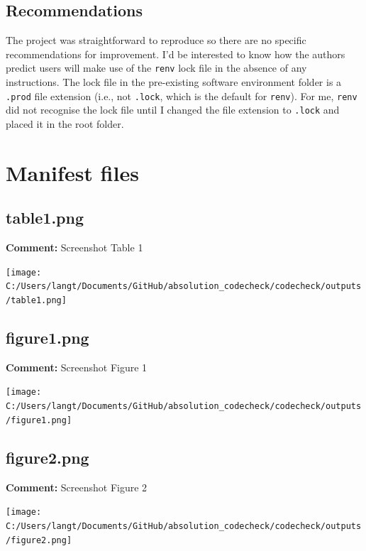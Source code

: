 \documentclass[
]{article}
\begin{document}
\clearpage

\subsection{Recommendations}\label{recommendations}

The project was straightforward to reproduce so there are no specific
recommendations for improvement. I'd be interested to know how the
authors predict users will make use of the \texttt{renv} lock file in
the absence of any instructions. The lock file in the pre-existing
software environment folder is a \texttt{.prod} file extension (i.e.,
not \texttt{.lock}, which is the default for \texttt{renv}). For me,
\texttt{renv} did not recognise the lock file until I changed the file
extension to \texttt{.lock} and placed it in the root folder.

\clearpage

\section{Manifest files}\label{manifest-files}

\subsection{table1.png}\label{table1.png}

\textbf{Comment:} Screenshot Table 1

\texttt{[image: C:/Users/langt/Documents/GitHub/absolution\_codecheck/codecheck/outputs/table1.png]}
\clearpage 

\subsection{figure1.png}\label{figure1.png}

\textbf{Comment:} Screenshot Figure 1

\texttt{[image: C:/Users/langt/Documents/GitHub/absolution\_codecheck/codecheck/outputs/figure1.png]}
\clearpage 

\subsection{figure2.png}\label{figure2.png}

\textbf{Comment:} Screenshot Figure 2

\texttt{[image: C:/Users/langt/Documents/GitHub/absolution\_codecheck/codecheck/outputs/figure2.png]}
\clearpage 
\end{document}
